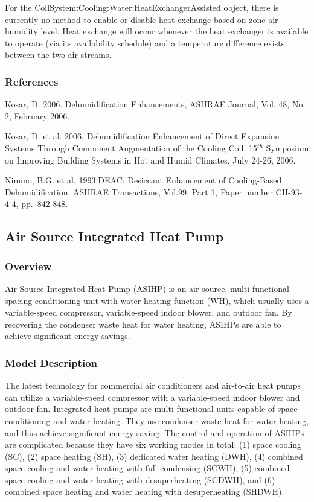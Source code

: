 For the CoilSystem:Cooling:Water:HeatExchangerAssisted object, there is currently no method to enable or disable heat exchange based on zone air humidity level. Heat exchange will occur whenever the heat exchanger is available to operate (via its availability schedule) and a temperature difference exists between the two air streams.

\subsubsection{References}\label{references-8}

Kosar, D. 2006. Dehumidification Enhancements, ASHRAE Journal, Vol. 48, No. 2, February 2006.

Kosar, D. et al. 2006. Dehumidification Enhancement of Direct Expansion Systems Through Component Augmentation of the Cooling Coil. 15\(^{th}\) Symposium on Improving Building Systems in Hot and Humid Climates, July 24-26, 2006.

Nimmo, B.G. et al. 1993.DEAC: Desiccant Enhancement of Cooling-Based Dehumidification. ASHRAE Transactions, Vol.99, Part 1, Paper number CH-93-4-4, pp.~842-848.


\subsection{Air Source Integrated Heat Pump}\label{Air-Source-Integrated-Heat-Pump-Section}

\subsubsection{Overview}\label{overview-ASIHP}

Air Source Integrated Heat Pump (ASIHP) is an air source, multi-functional spacing conditioning unit with water heating function (WH), which usually uses a variable-speed compressor, variable-speed indoor blower, and outdoor fan. By recovering the condenser waste heat for water heating, ASIHPs are able to achieve significant energy savings. 

\subsubsection{Model Description}\label{model-description-ASIHP}

The latest technology for commercial air conditioners and air-to-air heat pumps can utilize a variable-speed compressor with a variable-speed indoor blower and outdoor fan. Integrated heat pumps are multi-functional units capable of space conditioning and water heating. They use condenser waste heat for water heating, and thus achieve significant energy saving. The control and operation of ASIHPs are complicated because they have six working modes in total:  (1) space cooling (SC), (2) space heating (SH), (3) dedicated water heating (DWH), (4) combined space cooling and water heating with full condensing (SCWH), (5) combined space cooling and water heating with desuperheating (SCDWH), and (6) combined space heating and water heating with desuperheating (SHDWH). 

